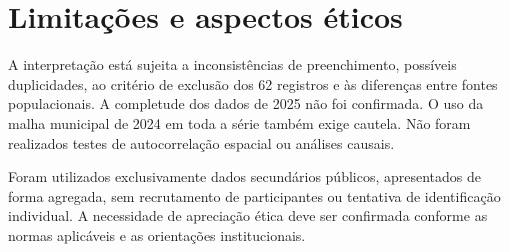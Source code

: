 \section{Limitações e aspectos éticos}
\label{sec:limitacoes}

A interpretação está sujeita a inconsistências de preenchimento, possíveis duplicidades, ao critério de exclusão dos 62 registros e às diferenças entre fontes populacionais. A completude dos dados de 2025 não foi confirmada. O uso da malha municipal de 2024 em toda a série também exige cautela. Não foram realizados testes de autocorrelação espacial ou análises causais.

Foram utilizados exclusivamente dados secundários públicos, apresentados de forma agregada, sem recrutamento de participantes ou tentativa de identificação individual. A necessidade de apreciação ética deve ser confirmada conforme as normas aplicáveis e as orientações institucionais.
